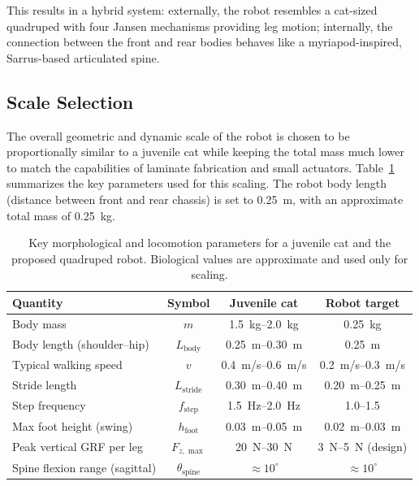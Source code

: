 \documentclass[11pt,letterpaper]{article}
\begin{document}
This results in a hybrid system: externally, the robot resembles a cat-sized
quadruped with four Jansen mechanisms providing leg motion; internally, the
connection between the front and rear bodies behaves like a myriapod-inspired,
Sarrus-based articulated spine.

\subsection{Scale Selection}

The overall geometric and dynamic scale of the robot is chosen to be
proportionally similar to a juvenile cat while keeping the total mass much
lower to match the capabilities of laminate fabrication and small actuators.
Table~\ref{tab:bio_robot_params} summarizes the key parameters used for this
scaling. The robot body length (distance between front and rear chassis) is
set to \SI{0.25}{m}, with an approximate total mass of \SI{0.25}{kg}.

\begin{table}[H]
    \centering
    \caption{Key morphological and locomotion parameters for a juvenile cat and the proposed quadruped robot. Biological values are approximate and used only for scaling.}
    \label{tab:bio_robot_params}
    \begin{tabular}{lccc}
        \toprule
        \textbf{Quantity} & \textbf{Symbol} & \textbf{Juvenile cat} & \textbf{Robot target} \\
        \midrule
        Body mass & $m$ & \SIrange{1.5}{2.0}{kg} & \SI{0.25}{kg} \\
        Body length (shoulder--hip) & $L_{\text{body}}$ & \SIrange{0.25}{0.30}{m} & \SI{0.25}{m} \\
        Typical walking speed & $v$ & \SIrange{0.4}{0.6}{m/s} & \SIrange{0.2}{0.3}{m/s} \\
        Stride length & $L_{\text{stride}}$ & \SIrange{0.30}{0.40}{m} & \SIrange{0.20}{0.25}{m} \\
        Step frequency & $f_{\text{step}}$ & \SIrange{1.5}{2.0}{Hz} & \numrange{1.0}{1.5} \\
        Max foot height (swing) & $h_{\text{foot}}$ & \SIrange{0.03}{0.05}{m} & \SIrange{0.02}{0.03}{m} \\
        Peak vertical GRF per leg & $F_{z,\max}$ & \SIrange{20}{30}{N} & \SIrange{3}{5}{N} (design) \\
        Spine flexion range (sagittal) & $\theta_{\text{spine}}$ & $\approx 10^\circ$ & $\approx 10^\circ$ \\
        \bottomrule
    \end{tabular}
\end{table}
\end{document}
